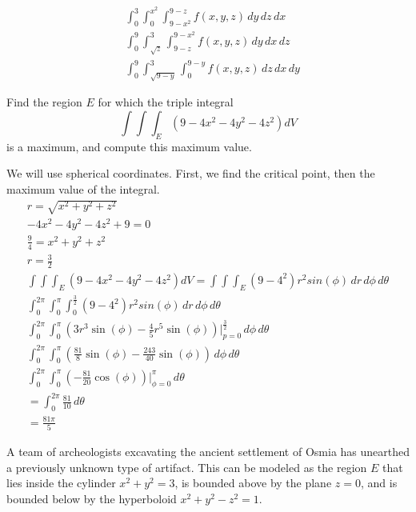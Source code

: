 \documentclass[12pt]{exam}
\begin{document}
\begin{questions}
\begin{solution}
\begin{align}
            &\int_{0}^{3}\int_{0}^{x^2}\int_{9-x^2}^{9-z} f(x, y, z) \, dy\, dz\, dx \\
            &\int_{0}^{9}\int_{\sqrt{z}}^{3}\int_{9-z}^{9-x^2} f(x, y, z) \, dy\, dx\, dz \\
            &\int_{0}^{9}\int_{\sqrt{9-y}}^{3}\int_{0}^{9-y} f(x, y, z) \, dz\, dx\, dy \tag*{\qed}
        \end{align}
    \end{solution}
    \clearpage
\question Find the region $E$ for which the triple integral
    \[ \int\int\int_{E} (9 - 4x^2 - 4y^2 - 4z^2) dV \]
    is a maximum, and compute this maximum value.
    \begin{solution}
        We will use spherical coordinates. First, we find the critical point, then the maximum value of the integral.
        \begin{gather*}
            r = \sqrt{x^2+y^2+z^2} \\
            -4x^2 - 4y^2 - 4z^2 + 9 = 0 \\
            \frac{9}{4} = x^2 + y^2 + z^2 \\
            r = \frac{3}{2} \\
            \int\int\int_{E} (9 - 4x^2 - 4y^2 - 4z^2) dV = \int\int\int_E (9-4^2)r^2sin(\phi)\, dr\, d\phi\, d\theta \\
            \int_{0}^{2\pi} \int_{0}^{\pi}\int_{0}^{\frac{3}{2}} (9-4^2)r^2sin(\phi)\, dr\, d\phi\, d\theta \\
            \int_{0}^{2\pi} \int_{0}^{\pi} \left(3r^3\sin(\phi) - \frac{4}{5}r^5\sin(\phi)\right)|_{p=0}^{\frac{3}{2}}\, d\phi\, d\theta \\
            \int_{0}^{2\pi} \int_{0}^{\pi} \left(\frac{81}{8}\sin(\phi) - \frac{243}{40}\sin(\phi)\right)\, d\phi\, d\theta \\
            \int_{0}^{2\pi} \int_{0}^{\pi} \left(- \frac{81}{20}\cos(\phi)\right)|_{\phi=0}^{\pi}\, d\theta \\
            = \int_{0}^{2\pi}\frac{81}{10}\, d\theta \\
            = \boxed{\frac{81\pi}{5}} \tag*{\qed}
        \end{gather*}
    \end{solution}
    \clearpage
\question A team of archeologists excavating the ancient settlement of Osmia has unearthed a previously unknown type of artifact. This can be modeled as the region $E$ that lies inside the cylinder $x^2 +y^2 = 3$, is bounded above by the plane $z = 0$, and is bounded below by the hyperboloid $x^2 + y^2 - z^2 = 1$.
\begin{parts}

\end{parts}
\end{questions}
\end{document}
